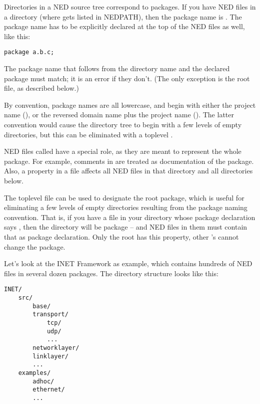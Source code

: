 Directories in a NED source tree correspond to packages. If you have
NED files in a  directory (where 
gets listed in NEDPATH), then the package name is .
The package name has to be explicitly declared at the top of the NED
files as well, like this:

\begin{Verbatim}
package a.b.c;
\end{Verbatim}

The package name that follows from the directory name and the declared
package must match; it is an error if they don't. (The only exception
is the root  file, as described below.)

By convention, package names are all lowercase, and begin with either
the project name (), or the reversed domain name plus the
project name (). The latter convention
would cause the directory tree to begin with a few levels of empty
directories, but this can be eliminated with a toplevel .

NED files called  have a special role, as they are meant
to represent the whole package. For example, comments in
 are treated as documentation of the package. Also, a
 property in a  file affects all NED
files in that directory and all directories below.

The toplevel  file can be used to designate the root
package, which is useful for eliminating a few levels of empty directories
resulting from the package naming convention. That is, if you have a
 file in your  directory whose package
declaration says , then the 
directory will be package  -- and NED
files in them must contain that as package declaration. Only the root
 has this property, other 's cannot
change the package.

Let's look at the INET Framework as example, which contains hundreds of NED
files in several dozen packages. The directory structure looks like this:

\begin{Verbatim}
INET/
    src/
        base/
        transport/
            tcp/
            udp/
            ...
        networklayer/
        linklayer/
        ...
    examples/
        adhoc/
        ethernet/
        ...
\end{Verbatim}

